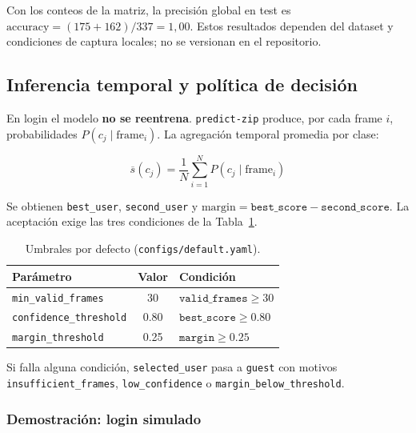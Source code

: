 Con los conteos de la matriz, la precisión global en test es
$\mathrm{accuracy} = (175 + 162) / 337 = 1{,}00$.
Estos resultados dependen del dataset y condiciones de captura locales; no se
versionan en el repositorio.

\subsection{Inferencia temporal y política de decisión}
\label{subsec:inferencia}

En login el modelo \textbf{no se reentrena}. \texttt{predict-zip} produce, por
cada frame $i$, probabilidades $P(c_j \mid \text{frame}_i)$. La agregación
temporal promedia por clase:

\begin{equation}
  \overline{s}(c_j) = \frac{1}{N} \sum_{i=1}^{N} P(c_j \mid \text{frame}_i)
  \label{eq:temporal-avg}
\end{equation}

Se obtienen \texttt{best\_user}, \texttt{second\_user} y
$\text{margin} = \texttt{best\_score} - \texttt{second\_score}$.
La aceptación exige las tres condiciones de la Tabla~\ref{tab:umbrales}.

\begin{table}[htbp]
  \centering
  \caption{Umbrales por defecto (\texttt{configs/default.yaml}).}
  \label{tab:umbrales}
  \begin{tabular}{@{}l c l@{}}
    \toprule
    \textbf{Parámetro} & \textbf{Valor} & \textbf{Condición} \\
    \midrule
    \texttt{min\_valid\_frames}   & 30   & $\texttt{valid\_frames} \geq 30$ \\
    \texttt{confidence\_threshold} & 0.80 & $\texttt{best\_score} \geq 0.80$ \\
    \texttt{margin\_threshold}    & 0.25 & $\texttt{margin} \geq 0.25$ \\
    \bottomrule
  \end{tabular}
\end{table}

Si falla alguna condición, \texttt{selected\_user} pasa a \texttt{guest} con
motivos \texttt{insufficient\_frames}, \texttt{low\_confidence} o
\texttt{margin\_below\_threshold}.

\subsubsection{Demostración: login simulado}


